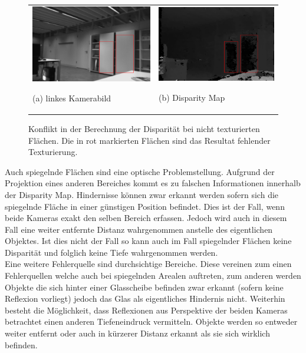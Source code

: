 \begin{figure}[h]
	\centering
	\begin{tabular}{m{6.5cm} m{6.5cm}}
	\includegraphics[width=6.5cm]{img/disparity_error_left.pdf}
	\begin{center} \small (a) linkes Kamerabild\end{center}
	&
	\includegraphics[width=6.5cm]{img/disparity_error.pdf}
	\begin{center} \small (b) Disparity Map \end{center}
	\end{tabular}
\caption{Konflikt in der Berechnung der Disparität bei nicht texturierten Flächen. Die in rot markierten Flächen sind das Resultat fehlender Texturierung.}
\label{fig:disparity-error-homogeneous}
\end{figure}

\noindent
Auch spiegelnde Flächen sind eine optische Problemstellung. Aufgrund der Projektion eines anderen Bereiches kommt es zu falschen Informationen innerhalb der Disparity Map. Hindernisse können zwar erkannt werden sofern sich die spiegelnde Fläche in einer günstigen Position befindet. Dies ist der Fall, wenn beide Kameras exakt den selben Bereich erfassen. Jedoch wird auch in diesem Fall eine weiter entfernte Distanz wahrgenommen anstelle des eigentlichen Objektes. Ist dies nicht der Fall so kann auch im Fall spiegelnder Flächen keine Disparität und folglich keine Tiefe wahrgenommen werden.\\
\noindent
Eine weitere Fehlerquelle sind durchsichtige Bereiche. Diese vereinen zum einen Fehlerquellen welche auch bei spiegelnden Arealen auftreten, zum anderen werden Objekte die sich hinter einer Glasscheibe befinden zwar erkannt (sofern keine Reflexion vorliegt) jedoch das Glas als eigentliches Hindernis nicht. Weiterhin besteht die Möglichkeit, dass Reflexionen aus Perspektive der beiden Kameras betrachtet einen anderen Tiefeneindruck vermitteln. Objekte werden so entweder weiter entfernt oder auch in kürzerer Distanz erkannt als sie sich wirklich befinden.\\

